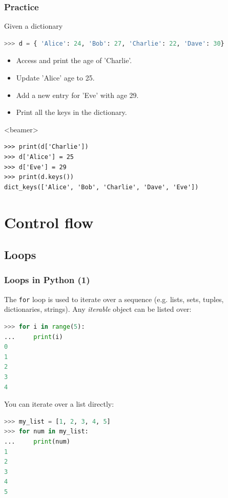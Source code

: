 \begin{frame}[fragile,label=practice_dictionary]
  \frametitle{Practice}
  Given a dictionary
  \begin{lstlisting}[language=Python,numbers=none]
>>> d = { 'Alice': 24, 'Bob': 27, 'Charlie': 22, 'Dave': 30}
  \end{lstlisting}
  \begin{itemize}
   \item Access and print the age of 'Charlie'.
   \item Update 'Alice' age to 25.
   \item Add a new entry for 'Eve' with age 29.
   \item Print all the keys in the dictionary.
  \end{itemize}\pause
  \begin{onlyenv}<beamer>
    \begin{lstlisting}[]
>>> print(d['Charlie'])
>>> d['Alice'] = 25
>>> d['Eve'] = 29
>>> print(d.keys())
dict_keys(['Alice', 'Bob', 'Charlie', 'Dave', 'Eve'])
    \end{lstlisting}
  \end{onlyenv}
 \end{frame}

 \section{Control flow}
 \subsection{Loops}
 
\begin{frame}[fragile]
  \frametitle{Loops in Python (1)}
  The \lstinline$for$ loop is used to iterate over a sequence (e.g. lists, sets, tuples, dictionaries, strings). Any \emph{iterable} object can be listed over:
  \begin{lstlisting}[language=Python,numbers=none]
>>> for i in range(5):
...     print(i)
0
1
2
3
4
  \end{lstlisting}\pause
  You can iterate over a list directly:
  \begin{lstlisting}[language=Python,numbers=none]
>>> my_list = [1, 2, 3, 4, 5]
>>> for num in my_list:
...     print(num)
1
2
3
4
5
  \end{lstlisting}
\end{frame}

